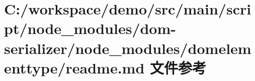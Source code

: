 \hypertarget{node__modules_2dom-serializer_2node__modules_2domelementtype_2_r_e_a_d_m_e_8md}{}\section{C\+:/workspace/demo/src/main/script/node\+\_\+modules/dom-\/serializer/node\+\_\+modules/domelementtype/readme.md 文件参考}
\label{node__modules_2dom-serializer_2node__modules_2domelementtype_2_r_e_a_d_m_e_8md}
